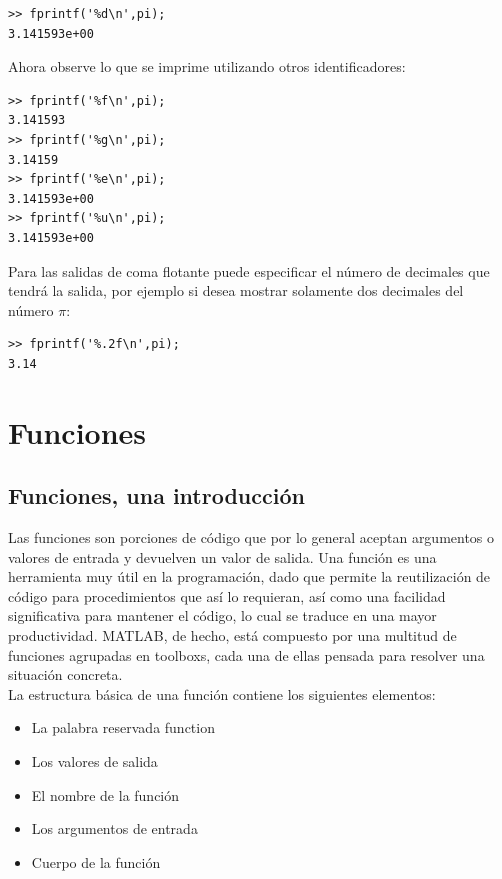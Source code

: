 \begin{verbatim}
>> fprintf('%d\n',pi);
3.141593e+00
\end{verbatim}

Ahora observe lo que se imprime utilizando otros identificadores:

\begin{verbatim}
>> fprintf('%f\n',pi);
3.141593
>> fprintf('%g\n',pi);
3.14159
>> fprintf('%e\n',pi);
3.141593e+00
>> fprintf('%u\n',pi);
3.141593e+00
\end{verbatim}

Para las salidas de coma flotante puede especificar el número de decimales que tendrá la salida, por ejemplo
si desea mostrar solamente dos decimales del número $\pi$:

\begin{verbatim}
>> fprintf('%.2f\n',pi);
3.14
\end{verbatim}


\section{Funciones}

\subsection{Funciones, una introducción}

Las funciones son porciones de código que por lo general aceptan argumentos o valores de 
entrada y devuelven un valor de salida. Una función es una herramienta muy útil en la 
programación, dado que permite la reutilización de código para procedimientos que así 
lo requieran, así como una facilidad significativa para mantener el código, lo cual se 
traduce en una mayor productividad.  MATLAB, de hecho, está compuesto por una multitud 
de funciones agrupadas en toolboxs, cada una de ellas pensada para resolver una 
situación concreta.\\

La estructura básica de una función contiene los siguientes elementos:

\begin{itemize}
\item La palabra reservada function
\item Los valores de salida
\item El nombre de la función
\item Los argumentos de entrada
\item Cuerpo de la función 
\end{itemize}

